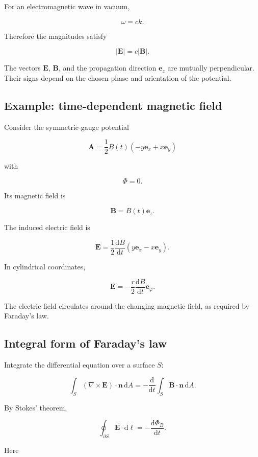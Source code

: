 For an electromagnetic wave in vacuum,

\[
\omega=ck.
\]

Therefore the magnitudes satisfy

\[
\boxed{
|\mathbf{E}|=c|\mathbf{B}|
}.
\]

The vectors \(\mathbf{E}\), \(\mathbf{B}\), and the propagation direction \(\mathbf{e}_z\) are mutually perpendicular. Their signs depend on the chosen phase and orientation of the potential.

\subsection{Example: time-dependent magnetic field}

Consider the symmetric-gauge potential

\[
\mathbf{A}
=
\frac{1}{2}
B(t)
\left(
-y\mathbf{e}_x
+x\mathbf{e}_y
\right)
\]

with

\[
\Phi=0.
\]

Its magnetic field is

\[
\mathbf{B}
=
B(t)\mathbf{e}_z.
\]

The induced electric field is

\[
\boxed{
\mathbf{E}
=
\frac{1}{2}
\frac{\mathrm{d}B}{\mathrm{d}t}
\left(
y\mathbf{e}_x
-
x\mathbf{e}_y
\right)
}.
\]

In cylindrical coordinates,

\[
\mathbf{E}
=
-
\frac{r}{2}
\frac{\mathrm{d}B}{\mathrm{d}t}
\mathbf{e}_{\varphi}.
\]

The electric field circulates around the changing magnetic field, as required by Faraday's law.

\subsection{Integral form of Faraday's law}

Integrate the differential equation over a surface \(S\):

\[
\int_S
\left(
\nabla\times\mathbf{E}
\right)
\cdot\mathbf{n}
\,\mathrm{d}A
=
-
\frac{\mathrm{d}}{\mathrm{d}t}
\int_S
\mathbf{B}\cdot\mathbf{n}
\,\mathrm{d}A.
\]

By Stokes' theorem,

\[
\boxed{
\oint_{\partial S}
\mathbf{E}\cdot\mathrm{d}\boldsymbol{\ell}
=
-
\frac{\mathrm{d}\Phi_B}{\mathrm{d}t}
}.
\]

Here

